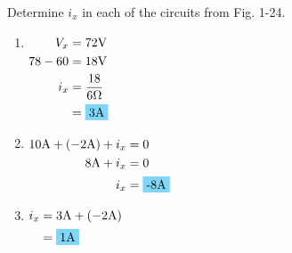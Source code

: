 Determine $i_x$ in each of the circuits from Fig. 1-24.

\begin{enumerate}[leftmargin=2cm,labelsep=.5cm,label=\bfseries\alph*)]
	\item $
	\begin{aligned}[t]
	V_x &= 72\qw{\V} \\
	78-60 &= 18\qw{\V} \\
	i_x &= \frac{18}{6\qw{\ohm}} \\
	&= \hlbox{3\qw{\ampere}}
	\end{aligned} $
	\\[1cm]
	
	\item $
	\begin{aligned}[t]
	10\qw{\A}+(-2\si{\A})+i_x &= 0 \\
	8\qw{\A}+i_x &= 0 \\
	i_x &= \hlbox{-8\qw{\ampere}}
	\end{aligned} $
	\\[1cm]
	
	\item $
	\begin{aligned}[t]
	i_x &= 3\qw{\A}+(-2\qw{\A}) \\
	&= \hlbox{1\qw{\ampere}}
	\end{aligned} $
	\\[1cm]
\end{enumerate}